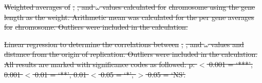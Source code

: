 \documentclass[11pt]{article}
\newcommand{\smel}{\textit{S.\,meliloti}\xspace}
\newcommand{\dn}{\textit{dN}\xspace}
\newcommand{\ds}{\textit{dS}\xspace}
\providecommand{\e}[1]{\ensuremath{\times 10^{#1}}}
\providecommand{\DIFdeltex}[1]{{\protect\color{red}\sout{#1}}}                      %
\providecommand{\DIFdelFL}[1]{\DIFdel{#1}} %
\providecommand{\DIFdel}[1]{\texorpdfstring{\DIFdeltex{#1}}{}} %
\begin{document}
\begin{table}[h]
{%
\DIFdelFL{Weighted averages of }%
\DIFdelFL{, }%
\DIFdelFL{, and $\omega$ values calculated for }%
\DIFdelFL{chromosome using the gene length as the weight. Arithmetic mean was calculated for the per gene averages for }%
\DIFdelFL{chromosome. Outliers were included in the calculation.}}


{%
\DIFdelFL{Linear regression to determine the correlations between }%
\DIFdelFL{, }%
\DIFdelFL{, and $\omega$ values and distance from the origin of replication.  Outliers were included in the calculation. All results are marked with significance codes as followed: p: $<$ 0.001 = `***', 0.001 $<$ 0.01 = `**', 0.01 $<$ 0.05 = `*', $>$ 0.05 = `NS'.}}



\end{table}
\end{document}
